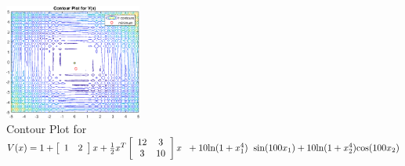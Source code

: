 \begin{figure}
    \centering
    \includegraphics[width=0.4\textwidth]{images/matlab/matlab_1c.eps}
    \caption{Contour Plot for $V(x) = 1 + \left[ \begin{array}{cc} 1 & 2 \end{array} \right] x + \frac{1}{2} x^T \left[ \begin{array}{cc} 12 & 3 \\ 3 & 10 \end{array} \right] x  \hspace{2mm} + 10 \mbox{ln}(1+ x_1^4) \hspace{2mm}\mbox{sin}(100x_1)+ 10 \mbox{ln}(1+x_2^4) \mbox{cos}(100x_2)$}
\end{figure}
